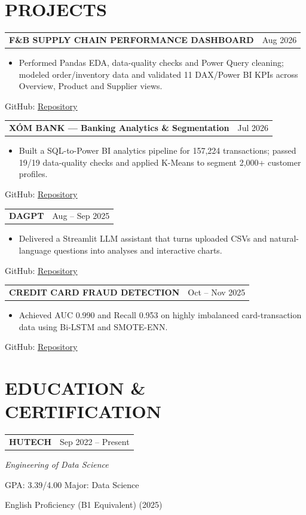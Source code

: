 \documentclass[10pt,letterpaper]{article}
\makeatletter
\newcommand{\cvsection}[2]{\section*{\faIcon{#1}\hspace{0.45em}#2}}
\newcommand{\cvlink}[2]{\href{#1}{\underline{#2}}}
\newcommand{\projectentry}[4]{%
  \begin{tabularx}{\textwidth}{@{}X>{\raggedleft\arraybackslash}p{1.52in}@{}}
    \textbf{#1} & \normalsize #2 \\
  \end{tabularx}\par
  \begin{itemize}[leftmargin=1.75em,itemsep=0em,topsep=0.08em,parsep=0em,partopsep=0em]
    \item \small #3
  \end{itemize}
  \small\hspace{1.15em}GitHub: \cvlink{#4}{Repository}\par
}
\makeatother
\begin{document}
\cvsection{briefcase}{PROJECTS}
\projectentry{F\&B SUPPLY CHAIN PERFORMANCE DASHBOARD}{Aug 2026}{Performed Pandas EDA, data-quality checks and Power Query cleaning; modeled order/inventory data and validated 11 DAX/Power BI KPIs across Overview, Product and Supplier views.}{https://github.com/lehoanggiavi/F-B-Supply-Chain}
\vspace{0.16em}
\projectentry{XÓM BANK --- Banking Analytics \& Segmentation}{Jul 2026}{Built a SQL-to-Power BI analytics pipeline for 157,224 transactions; passed 19/19 data-quality checks and applied K-Means to segment 2,000+ customer profiles.}{https://github.com/lehoanggiavi/Banking}
\vspace{0.16em}
\projectentry{DAGPT}{Aug -- Sep 2025}{Delivered a Streamlit LLM assistant that turns uploaded CSVs and natural-language questions into analyses and interactive charts.}{https://github.com/lehoanggiavi/dagpt}
\vspace{0.16em}
\projectentry{CREDIT CARD FRAUD DETECTION}{Oct -- Nov 2025}{Achieved AUC 0.990 and Recall 0.953 on highly imbalanced card-transaction data using Bi-LSTM and SMOTE-ENN.}{https://github.com/lehoanggiavi/ccfd}

\cvsection{graduation-cap}{EDUCATION \& CERTIFICATION}
\begin{tabularx}{\textwidth}{@{}X>{\raggedleft\arraybackslash}p{1.52in}@{}}
  \textbf{HUTECH} & \normalsize Sep 2022 -- Present \\
\end{tabularx}\par
\small\textit{Engineering of Data Science}\par
\small GPA: 3.39/4.00 \quad\textbullet\quad Major: Data Science\par
\small English Proficiency (B1 Equivalent) (2025)
\end{document}
